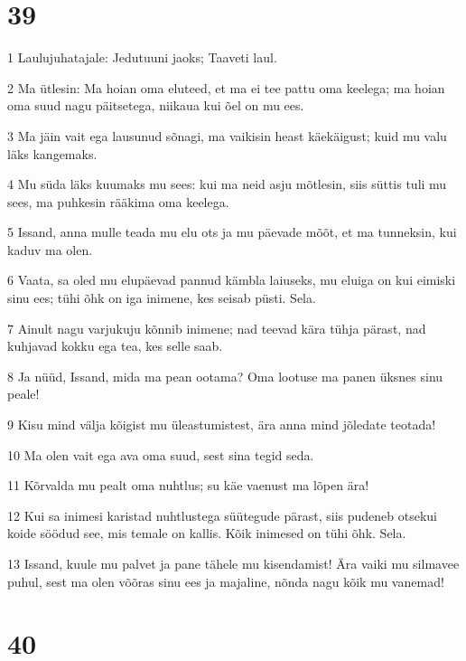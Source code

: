 \chapter{39}

\par 1 Laulujuhatajale: Jedutuuni jaoks; Taaveti laul.
\par 2 Ma ütlesin: Ma hoian oma eluteed, et ma ei tee pattu oma keelega; ma hoian oma suud nagu päitsetega, niikaua kui õel on mu ees.
\par 3 Ma jäin vait ega lausunud sõnagi, ma vaikisin heast käekäigust; kuid mu valu läks kangemaks.
\par 4 Mu süda läks kuumaks mu sees: kui ma neid asju mõtlesin, siis süttis tuli mu sees, ma puhkesin rääkima oma keelega.
\par 5 Issand, anna mulle teada mu elu ots ja mu päevade mõõt, et ma tunneksin, kui kaduv ma olen.
\par 6 Vaata, sa oled mu elupäevad pannud kämbla laiuseks, mu eluiga on kui eimiski sinu ees; tühi õhk on iga inimene, kes seisab püsti. Sela.
\par 7 Ainult nagu varjukuju kõnnib inimene; nad teevad kära tühja pärast, nad kuhjavad kokku ega tea, kes selle saab.
\par 8 Ja nüüd, Issand, mida ma pean ootama? Oma lootuse ma panen üksnes sinu peale!
\par 9 Kisu mind välja kõigist mu üleastumistest, ära anna mind jõledate teotada!
\par 10 Ma olen vait ega ava oma suud, sest sina tegid seda.
\par 11 Kõrvalda mu pealt oma nuhtlus; su käe vaenust ma lõpen ära!
\par 12 Kui sa inimesi karistad nuhtlustega süütegude pärast, siis pudeneb otsekui koide söödud see, mis temale on kallis. Kõik inimesed on tühi õhk. Sela.
\par 13 Issand, kuule mu palvet ja pane tähele mu kisendamist! Ära vaiki mu silmavee puhul, sest ma olen võõras sinu ees ja majaline, nõnda nagu kõik mu vanemad!

\chapter{40}

